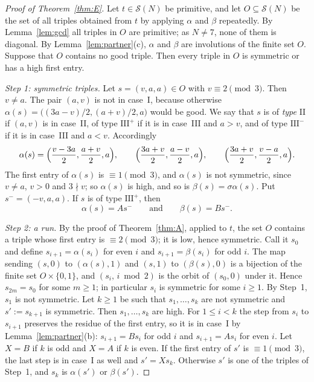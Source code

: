 \documentclass[11pt]{amsart}
\theoremstyle{definition}
\theoremstyle{remark}
\newcommand{\cS}{\mathcal{S}}
\begin{document}
\begin{proof}[Proof of Theorem~\ref{thm:E}]
Let $t\in\cS(N)$ be primitive, and let $O\subseteq\cS(N)$ be the set of all triples obtained from $t$ by applying $\alpha$ and $\beta$ repeatedly.
By Lemma~\ref{lem:gcd} all triples in $O$ are primitive; as $N\ne 7$, none of them is diagonal. By Lemma~\ref{lem:partner}(c), $\alpha$ and $\beta$ are involutions of the finite set $O$.
Suppose that $O$ contains no good triple. Then every triple in $O$ is symmetric or has a high first entry.

\emph{Step 1: symmetric triples.} Let $s=(v,a,a)\in O$ with $v\equiv 2\pmod 3$. Then $v\ne a$.
The pair $(a,v)$ is not in case~I, because otherwise $\alpha(s)=\bigl((3a-v)/2,(a+v)/2,a\bigr)$ would be good.
We say that $s$ is of \emph{type} II if $(a,v)$ is in case~II, of type $\mathrm{III}^+$ if it is in case~III and $a>v$, and of type $\mathrm{III}^-$ if it is in case~III and $a<v$. Accordingly
\[
\alpha(s)=\Bigl(\frac{v-3a}{2},\frac{a+v}{2},a\Bigr),\qquad \Bigl(\frac{3a+v}{2},\frac{a-v}{2},a\Bigr),\qquad \Bigl(\frac{3a+v}{2},\frac{v-a}{2},a\Bigr).
\]
The first entry of $\alpha(s)$ is $\equiv 1\pmod 3$, and $\alpha(s)$ is not symmetric, since $v\ne a$, $v>0$ and $3\nmid v$; so $\alpha(s)$ is high, and so is $\beta(s)=\sigma\alpha(s)$.
Put $s^-=(-v,a,a)$. If $s$ is of type $\mathrm{III}^+$, then
\begin{equation}\label{eq:minus}
\alpha(s)=As^-\qquad\text{and}\qquad \beta(s)=Bs^- .
\end{equation}

\emph{Step 2: a run.} By the proof of Theorem~\ref{thm:A}, applied to $t$, the set $O$ contains a triple whose first entry is $\equiv 2\pmod 3$; it is low, hence symmetric.
Call it $s_0$ and define $s_{i+1}=\alpha(s_i)$ for even $i$ and $s_{i+1}=\beta(s_i)$ for odd $i$. The map sending $(s,0)$ to $(\alpha(s),1)$ and $(s,1)$ to $(\beta(s),0)$ is a bijection of the finite set $O\times\{0,1\}$,
and $(s_i,\,i\bmod 2)$ is the orbit of $(s_0,0)$ under it. Hence $s_{2m}=s_0$ for some $m\ge 1$; in particular $s_i$ is symmetric for some $i\ge 1$. By Step~1, $s_1$ is not symmetric. Let $k\ge 1$ be such that $s_1,\dots,s_k$ are not symmetric and $s':=s_{k+1}$ is symmetric.
Then $s_1,\dots,s_k$ are high. For $1\le i<k$ the step from $s_i$ to $s_{i+1}$ preserves the residue of the first entry, so it is in case~I by Lemma~\ref{lem:partner}(b):
$s_{i+1}=Bs_i$ for odd $i$ and $s_{i+1}=As_i$ for even $i$. Let $X=B$ if $k$ is odd and $X=A$ if $k$ is even.
If the first entry of $s'$ is $\equiv 1\pmod 3$, the last step is in case~I as well and $s'=Xs_k$.
Otherwise $s'$ is one of the triples of Step~1, and $s_k$ is $\alpha(s')$ or $\beta(s')$.


\end{proof}
\end{document}
